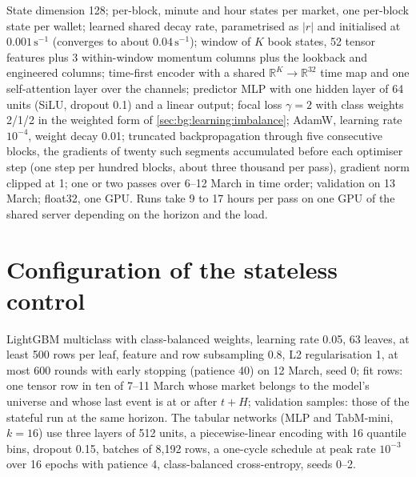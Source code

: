 State dimension 128; per-block, minute and hour states per market, one per-block state per
wallet; learned shared decay rate, parametrised as $|r|$ and initialised at $0.001\,\mathrm{s}^{-1}$
(converges to about $0.04\,\mathrm{s}^{-1}$); window of
$K$ book states, 52 tensor features plus 3 within-window momentum columns plus the lookback
and engineered columns; time-first encoder with a shared $\mathbb{R}^{K} \to \mathbb{R}^{32}$ time
map and one self-attention layer over the channels; predictor MLP with one hidden layer of
64 units (SiLU, dropout 0.1) and a linear output; focal loss $\gamma = 2$ with class weights
2/1/2 in the weighted form of \cref{sec:bg:learning:imbalance}; AdamW, learning rate
$10^{-4}$, weight decay 0.01; truncated backpropagation through five consecutive blocks, the
gradients of twenty such segments accumulated before each optimiser step (one step per
hundred blocks, about three thousand per pass), gradient norm clipped at 1; one or two
passes over 6--12 March in time order; validation on 13 March; float32, one GPU.  Runs take
9 to 17 hours per pass on one GPU of the shared server depending on the horizon and the load.

\section*{Configuration of the stateless control}

LightGBM multiclass with class-balanced weights, learning rate 0.05, 63 leaves, at least 500
rows per leaf, feature and row subsampling 0.8, L2 regularisation 1, at most 600 rounds with
early stopping (patience 40) on 12 March, seed 0; fit rows: one tensor row in ten of 7--11
March whose market belongs to the model's universe and whose last event is at or after
$t + H$; validation samples: those of the stateful run at the same horizon.  The tabular
networks (MLP and TabM-mini, $k = 16$) use three layers of 512 units, a piecewise-linear
encoding with 16 quantile bins, dropout 0.15, batches of 8{,}192 rows, a one-cycle schedule
at peak rate $10^{-3}$ over 16 epochs with patience 4, class-balanced cross-entropy, seeds
0--2.
